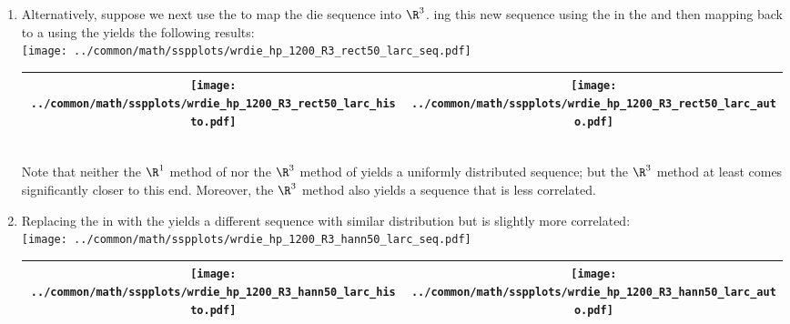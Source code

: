 \begin{example}
\begin{enumerate}
  \item \label{item:wrdie_hp_R3_rect50_larc}
        Alternatively, suppose we next use the  
        to map the die sequence into $\R^3$.
        ing this new sequence using the 
        in the   
        and then mapping back to a  %
        using the  yields the following results:
        \\\texttt{[image: ../common/math/sspplots/wrdie\_hp\_1200\_R3\_rect50\_larc\_seq.pdf]}
        \\\begin{tabular}{|>{\scs}c|>{\scs}c|}
             \hline
             \texttt{[image: ../common/math/sspplots/wrdie\_hp\_1200\_R3\_rect50\_larc\_histo.pdf]}
            &\texttt{[image: ../common/math/sspplots/wrdie\_hp\_1200\_R3\_rect50\_larc\_auto.pdf]}
           \\\hline
        \end{tabular}\\
        Note that neither the $\R^1$ method of 
        nor the $\R^3$ method of 
        yields a uniformly distributed sequence; 
        but the $\R^3$ method at least comes significantly closer to this end.
        Moreover, the $\R^3$ method also yields a sequence that is less correlated.

  \item \label{item:wrdie_hp_R3_hann50_larc}
        Replacing the  in 
        with the   yields a different sequence
        with similar distribution but is slightly more correlated:
        \\\texttt{[image: ../common/math/sspplots/wrdie\_hp\_1200\_R3\_hann50\_larc\_seq.pdf]}
        \\\begin{tabular}{|>{\scs}c|>{\scs}c|}
             \hline
             \texttt{[image: ../common/math/sspplots/wrdie\_hp\_1200\_R3\_hann50\_larc\_histo.pdf]}
            &\texttt{[image: ../common/math/sspplots/wrdie\_hp\_1200\_R3\_hann50\_larc\_auto.pdf]}
           \\\hline
        \end{tabular}


\end{enumerate}
\end{example}
